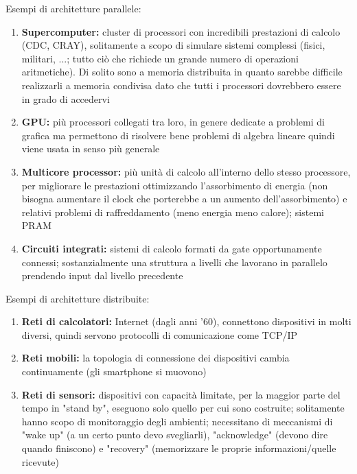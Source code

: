 Esempi di architetture parallele: 
\begin{enumerate}
	\item \textbf{Supercomputer:} cluster di processori con incredibili prestazioni di calcolo (CDC, CRAY), solitamente a scopo di simulare sistemi complessi (fisici, militari, ...; tutto ciò che richiede un grande numero di operazioni aritmetiche). Di solito sono a memoria distribuita in quanto sarebbe difficile realizzarli a memoria condivisa dato che tutti i processori dovrebbero essere in grado di accedervi
	
	\item \textbf{GPU:} più processori collegati tra loro, in genere dedicate a problemi di grafica ma permettono di risolvere bene problemi di algebra lineare quindi viene usata in senso più generale
	
	\item \textbf{Multicore processor:} più unità di calcolo all'interno dello stesso processore, per migliorare le prestazioni ottimizzando l'assorbimento di energia (non bisogna aumentare il clock che porterebbe a un aumento dell'assorbimento) e relativi problemi di raffreddamento (meno energia meno calore); sistemi PRAM
	
	\item \textbf{Circuiti integrati:} sistemi di calcolo formati da gate opportunamente connessi; sostanzialmente una struttura a livelli che lavorano in parallelo prendendo input dal livello precedente
\end{enumerate}

Esempi di architetture distribuite:
\begin{enumerate}
	\item \textbf{Reti di calcolatori:} Internet (dagli anni '60), connettono dispositivi in molti diversi, quindi servono protocolli di comunicazione come TCP/IP
	
	\item \textbf{Reti mobili:} la topologia di connessione dei dispositivi cambia continuamente (gli smartphone si muovono)
	
	\item \textbf{Reti di sensori:} dispositivi con capacità limitate, per la maggior parte del tempo in "stand by", eseguono solo quello per cui sono costruite; solitamente hanno scopo di monitoraggio degli ambienti; necessitano di meccanismi di "wake up" (a un certo punto devo svegliarli), "acknowledge" (devono dire quando finiscono) e "recovery" (memorizzare le proprie informazioni/quelle ricevute)
\end{enumerate}

